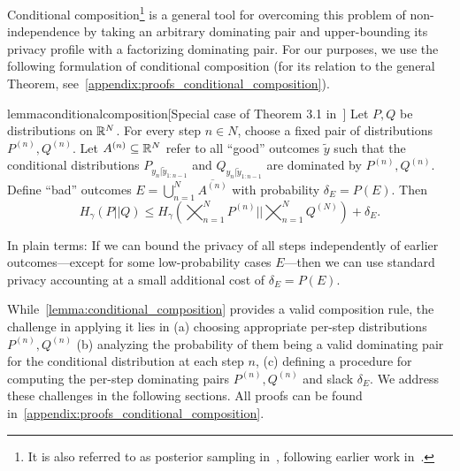 \documentclass{article}
\theoremstyle{plain}
\theoremstyle{definition}
\theoremstyle{remark}
\begin{document}
Conditional composition\footnote{It is also referred to as posterior sampling in~\cite{feldman2025privacy}, following earlier work in~\cite{erlingsson2020encode}.} is a general tool for overcoming this problem of non-independence by taking an arbitrary dominating pair and upper-bounding its privacy profile with a factorizing dominating pair.
For our purposes, we use the following formulation of conditional composition (for its relation to the general Theorem, see~\cref{appendix:proofs_conditional_composition}).
\begin{restatable}{lemma}{conditionalcomposition}[Special case of Theorem 3.1 in~\cite{choquette2023privacy}]
\label{lemma:conditional_composition}
    Let $P, Q$ be distributions on ${\mathbb{R}}^{N}$.
    For every step $n \in {N}$, choose a fixed pair of distributions $P^{(n)}, Q^{(n)}$.
    Let $A^{(n)} \subseteq {\mathbb{R}}^N$ refer to all ``good'' outcomes $\tilde{y}$ such that
    the conditional distributions $P_{y_n | \tilde{y}_{1:n-1}}$
    and $Q_{y_n | \tilde{y}_{1:n-1}}$ are dominated by $P^{(n)}, Q^{(n)}$.
    Define ``bad'' outcomes $E = \bigcup\nolimits_{n=1}^N \overline{A^{(n)}}$ with probability $\delta_E = P(E)$.
    Then
    \begin{equation*}
        H_\gamma(P || Q) \leq H_\gamma \left( \bigtimes\nolimits_{n=1}^N P^{(n)}  || \bigtimes\nolimits_{n=1}^N  Q^{(N)} \right) + \delta_E.
    \end{equation*}
\end{restatable}
In plain terms: If we can bound the privacy of all steps independently of earlier outcomes---except for some low-probability cases $E$---then we can use standard privacy accounting at a small additional cost of $\delta_E = P(E)$.

While~\cref{lemma:conditional_composition} provides a valid composition rule, the challenge in applying it lies in 
(a) choosing appropriate per-step distributions $P^{(n)}, Q^{(n)}$
(b) analyzing the probability of them being a valid dominating pair for the conditional distribution at each step $n$, 
(c) defining a procedure for computing  the per-step dominating pairs $P^{(n)},Q^{(n)}$ and slack $\delta_E$.
We address these challenges in the following sections.
All proofs can be found in~\cref{appendix:proofs_conditional_composition}.
\end{document}
